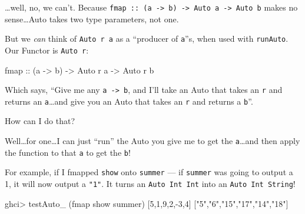 \documentclass[]{article}
\newenvironment{Shaded}{}{}
\newcommand{\KeywordTok}[1]{\textcolor[rgb]{0.00,0.44,0.13}{\textbf{{#1}}}}
\newcommand{\DataTypeTok}[1]{\textcolor[rgb]{0.56,0.13,0.00}{{#1}}}
\newcommand{\DecValTok}[1]{\textcolor[rgb]{0.25,0.63,0.44}{{#1}}}
\newcommand{\StringTok}[1]{\textcolor[rgb]{0.25,0.44,0.63}{{#1}}}
\newcommand{\CommentTok}[1]{\textcolor[rgb]{0.38,0.63,0.69}{\textit{{#1}}}}
\newcommand{\OtherTok}[1]{\textcolor[rgb]{0.00,0.44,0.13}{{#1}}}
\newcommand{\FunctionTok}[1]{\textcolor[rgb]{0.02,0.16,0.49}{{#1}}}
\newcommand{\NormalTok}[1]{{#1}}
\begin{document}
\ldots{}well, no, we can't. Because
\texttt{fmap\ ::\ (a\ -\textgreater{}\ b)\ -\textgreater{}\ Auto\ a\ -\textgreater{}\ Auto\ b}
makes no sense\ldots{}Auto takes two type parameters, not one.

But we \emph{can} think of \texttt{Auto\ r\ a} as a ``producer of \texttt{a}''s,
when used with \texttt{runAuto}. Our Functor is \texttt{Auto\ r}:

\begin{Shaded}
\begin{Highlighting}[]
\NormalTok{fmap}\OtherTok{ ::} \NormalTok{(a }\OtherTok{->} \NormalTok{b) }\OtherTok{->} \DataTypeTok{Auto} \NormalTok{r a }\OtherTok{->} \DataTypeTok{Auto} \NormalTok{r b}
\end{Highlighting}
\end{Shaded}

Which says, ``Give me any \texttt{a\ -\textgreater{}\ b}, and I'll take an Auto
that takes an \texttt{r} and returns an \texttt{a}\ldots{}and give you an Auto
that takes an \texttt{r} and returns a \texttt{b}''.

How can I do that?

Well\ldots{}for one\ldots{}I can just ``run'' the Auto you give me to get the
\texttt{a}\ldots{}and then apply the function to that \texttt{a} to get the
\texttt{b}!

For example, if I fmapped \texttt{show} onto \texttt{summer} --- if
\texttt{summer} was going to output a 1, it will now output a \texttt{"1"}. It
turns an \texttt{Auto\ Int\ Int} into an \texttt{Auto\ Int\ String}!

\begin{Shaded}
\end{Shaded}

\begin{Shaded}
\begin{Highlighting}[]
\NormalTok{ghci}\FunctionTok{>} \NormalTok{testAuto_ (fmap show summer) [}\DecValTok{5}\NormalTok{,}\DecValTok{1}\NormalTok{,}\DecValTok{9}\NormalTok{,}\DecValTok{2}\NormalTok{,}\FunctionTok{-}\DecValTok{3}\NormalTok{,}\DecValTok{4}\NormalTok{]}
\NormalTok{[}\StringTok{"5"}\NormalTok{,}\StringTok{"6"}\NormalTok{,}\StringTok{"15"}\NormalTok{,}\StringTok{"17"}\NormalTok{,}\StringTok{"14"}\NormalTok{,}\StringTok{"18"}\NormalTok{]}
\end{Highlighting}
\end{Shaded}
\end{document}
